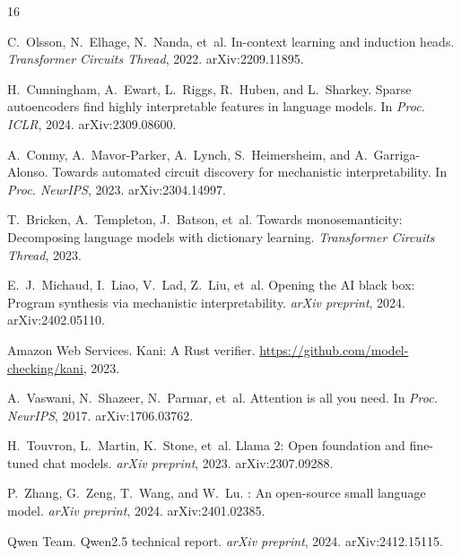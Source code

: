 \documentclass[11pt]{article}
\begin{document}

\begin{thebibliography}{16}

C.~Olsson, N.~Elhage, N.~Nanda, et~al.
\newblock In-context learning and induction heads.
\newblock \emph{Transformer Circuits Thread}, 2022. arXiv:2209.11895.

H.~Cunningham, A.~Ewart, L.~Riggs, R.~Huben, and L.~Sharkey.
\newblock Sparse autoencoders find highly interpretable features in language models.
\newblock In \emph{Proc. ICLR}, 2024. arXiv:2309.08600.

A.~Conmy, A.~Mavor-Parker, A.~Lynch, S.~Heimersheim, and A.~Garriga-Alonso.
\newblock Towards automated circuit discovery for mechanistic interpretability.
\newblock In \emph{Proc. NeurIPS}, 2023. arXiv:2304.14997.

T.~Bricken, A.~Templeton, J.~Batson, et~al.
\newblock Towards monosemanticity: Decomposing language models with dictionary learning.
\newblock \emph{Transformer Circuits Thread}, 2023.

E.~J.~Michaud, I.~Liao, V.~Lad, Z.~Liu, et~al.
\newblock Opening the {AI} black box: Program synthesis via mechanistic interpretability.
\newblock \emph{arXiv preprint}, 2024. arXiv:2402.05110.

{Amazon Web Services}.
\newblock Kani: A {Rust} verifier.
\newblock \url{https://github.com/model-checking/kani}, 2023.

A.~Vaswani, N.~Shazeer, N.~Parmar, et~al.
\newblock Attention is all you need.
\newblock In \emph{Proc. NeurIPS}, 2017. arXiv:1706.03762.

H.~Touvron, L.~Martin, K.~Stone, et~al.
\newblock Llama 2: Open foundation and fine-tuned chat models.
\newblock \emph{arXiv preprint}, 2023. arXiv:2307.09288.

P.~Zhang, G.~Zeng, T.~Wang, and W.~Lu.
: An open-source small language model.
\newblock \emph{arXiv preprint}, 2024. arXiv:2401.02385.

{Qwen Team}.
\newblock Qwen2.5 technical report.
\newblock \emph{arXiv preprint}, 2024. arXiv:2412.15115.


\end{thebibliography}
\end{document}
